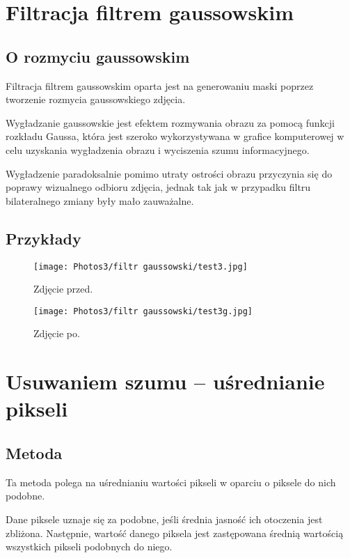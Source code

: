 \documentclass[]{mwart}
\begin{document}
\section{Filtracja filtrem gaussowskim           }
\subsection{O rozmyciu gaussowskim}
Filtracja filtrem gaussowskim oparta jest na generowaniu maski poprzez tworzenie rozmycia gaussowskiego zdjęcia.

Wygładzanie gaussowskie jest efektem rozmywania obrazu za pomocą funkcji rozkładu Gaussa,
która jest szeroko wykorzystywana w grafice komputerowej w celu uzyskania wygładzenia obrazu i wyciszenia szumu informacyjnego.

Wygładzenie paradoksalnie pomimo utraty ostrości obrazu przyczynia się do poprawy wizualnego odbioru zdjęcia, jednak
tak jak w przypadku filtru bilateralnego zmiany były mało zauważalne.

\subsection{Przykłady}

\begin{figure}[H]
    \centering
    \texttt{[image: Photos3/filtr gaussowski/test3.jpg]}
    \caption{Zdjęcie przed.}
\end{figure} \newpage
\begin{figure}[H]
    \centering
    \texttt{[image: Photos3/filtr gaussowski/test3g.jpg]}
    \caption{Zdjęcie po.}
\end{figure}





\vfill
\section{Usuwaniem szumu -- uśrednianie pikseli}
\subsection{Metoda}
Ta metoda polega na uśrednianiu wartości pikseli w oparciu o piksele do nich podobne.

Dane piksele uznaje się za podobne, jeśli średnia jasność ich otoczenia
jest zbliżona. Następnie, wartość danego piksela jest zastępowana
średnią wartością wszystkich pikseli podobnych do niego.
\end{document}
